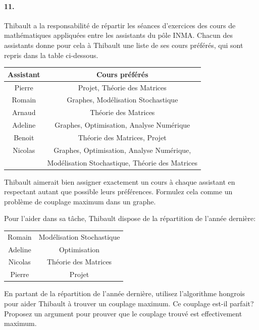 \paragraph{11. } Thibault a la responsabilité de répartir les séances d'exercices des cours de mathématiques appliquées entre les assistants du pôle INMA. Chacun des assistants donne pour cela à Thibault une liste de ses cours préférés, qui sont repris dans la table ci-dessous.

\begin{center}
  \begin{tabular}{|c|c|}
    \hline
    Assistant & Cours préférés \\
    \hline
    Pierre & Projet, Théorie des Matrices \\
    Romain & Graphes, Modélisation Stochastique \\
    Arnaud & Théorie des Matrices \\
    Adeline & Graphes, Optimisation, Analyse Numérique \\
    Benoit & Théorie des Matrices, Projet \\
    Nicolas & Graphes, Optimisation, Analyse Numérique, \\
            & Modélisation Stochastique, Théorie des Matrices  \\
    \hline
  \end{tabular}
\end{center}

Thibault aimerait bien assigner exactement un cours à chaque assistant en respectant autant que possible leurs préférences. Formulez cela comme un problème de couplage maximum dans un graphe.

Pour l'aider dans sa tâche, Thibault dispose de la répartition de l'année dernière:

\begin{center}
  \begin{tabular}{|c|c|}
    \hline
    Romain & Modélisation Stochastique \\
    Adeline & Optimisation \\
    Nicolas & Théorie des Matrices \\
    Pierre & Projet \\
    \hline
  \end{tabular}
\end{center}

En partant de la répartition de l'année dernière, utilisez l'algorithme hongrois pour aider Thibault à trouver un couplage maximum. Ce couplage est-il parfait? Proposez un argument pour prouver que le couplage trouvé est effectivement maximum.




